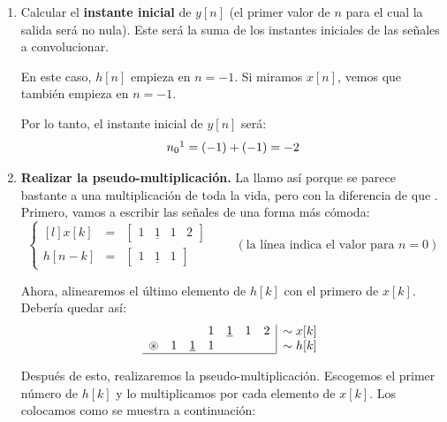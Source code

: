 \documentclass[a4paper]{book}
\begin{document}
\begin{enumerate}
	\item Calcular el \textbf{instante inicial} de $y[n]$ (el primer valor de $n$ para el cual la salida será no nula). Este será la suma de los instantes iniciales de las señales a convolucionar.

	      En este caso, $h[n]$ empieza en $n=-1$. Si miramos $x[n]$, vemos que también empieza en $n=-1$.

	      Por lo tanto, el instante inicial de $y[n]$ será: \[n_0\footnotemark = (-1)+(-1) = -2\]

	\item \textbf{Realizar la pseudo-multiplicación.} La llamo así porque se parece bastante a una multiplicación de toda la vida, pero con la diferencia de que . Primero, vamos a escribir las señales de una forma más cómoda: \[\left\lbrace \begin{matrix*}[l]
			      x[k] &=& [\begin{matrix} 1 & \underline{1}& 1 &2 \end{matrix} ]\\[5pt]
			      h[n-k] &=& [\begin{matrix} 1 & \underline{1}& 1 \end{matrix} ]
		      \end{matrix*} \right. \qquad (\text{la línea indica el valor para }n=0)\]

	      Ahora, alinearemos el último elemento de $h[k]$ con el primero de $x[k]$. Debería quedar así:
	      \[ \begin{array}{ccccccc}
			                  &   &               & 1 & \underline{1} & 1 & 2 \\
			      \circledast & 1 & \underline{1} & 1 &               &   &   \\
			      \hline
		      \end{array}
		      \begin{array}{|l}
			      \sim x[k] \\
			      \sim h[k]
		      \end{array}\]

	      Después de esto, realizaremos la pseudo-multiplicación. Escogemos el primer número de $h[k]$ y lo multiplicamos por cada elemento de $x[k]$. Los colocamos como se muestra a continuación:


\end{enumerate}
\end{document}
